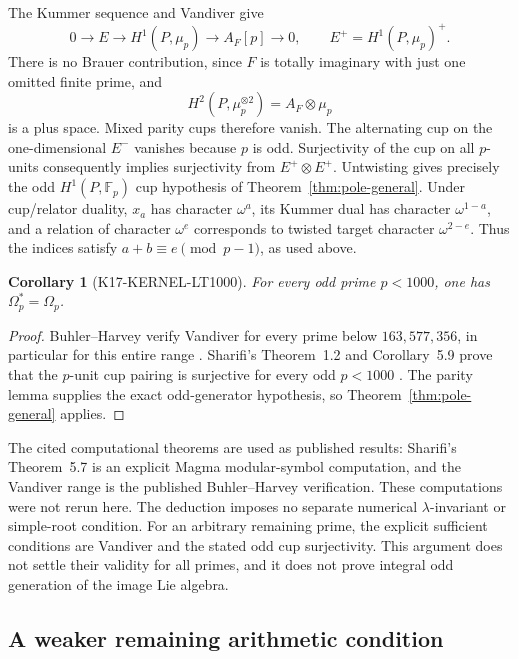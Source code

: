 \documentclass[11pt,a4paper]{article}
\newtheorem{corollary}[theorem]{Corollary}
\theoremstyle{definition}
\begin{document}
The Kummer sequence and Vandiver give
\[
 0\longrightarrow E\longrightarrow H^1(P,\mu_p)
  \longrightarrow A_F[p]\longrightarrow0,
 \qquad E^+=H^1(P,\mu_p)^+.
\]
There is no Brauer contribution, since $F$ is totally imaginary with just one omitted finite prime, and
\[
 H^2(P,\mu_p^{\otimes2})=A_F\otimes\mu_p
\]
is a plus space. Mixed parity cups therefore vanish. The alternating cup on the one-dimensional $E^-$ vanishes because $p$ is odd. Surjectivity of the cup on all $p$-units consequently implies surjectivity from $E^+\otimes E^+$. Untwisting gives precisely the odd $H^1(P,\mathbb F_p)$ cup hypothesis of Theorem~\ref{thm:pole-general}. Under cup/relator duality, $x_a$ has character $\omega^a$, its Kummer dual has character $\omega^{1-a}$, and a relation of character $\omega^e$ corresponds to twisted target character $\omega^{2-e}$. Thus the indices satisfy $a+b\equiv e\pmod{p-1}$, as used above.

\begin{corollary}[K17-KERNEL-LT1000]\label{cor:kernel-lt1000}
For every odd prime $p<1000$, one has $\Omega_p^*=\Omega_p$.
\end{corollary}
\begin{proof}
Buhler--Harvey verify Vandiver for every prime below $163{,}577{,}356$, in particular for this entire range \cite[abstract and \S1, p.~1]{BuhlerHarvey2011}. Sharifi's Theorem~1.2 and Corollary~5.9 prove that the $p$-unit cup pairing is surjective for every odd $p<1000$ \cite[pp.~2 and~27]{Sharifi2007}. The parity lemma supplies the exact odd-generator hypothesis, so Theorem~\ref{thm:pole-general} applies.
\end{proof}

The cited computational theorems are used as published results: Sharifi's Theorem~5.7 is an explicit Magma modular-symbol computation, and the Vandiver range is the published Buhler--Harvey verification. These computations were not rerun here. The deduction imposes no separate numerical $\lambda$-invariant or simple-root condition. For an arbitrary remaining prime, the explicit sufficient conditions are Vandiver and the stated odd cup surjectivity. This argument does not settle their validity for all primes, and it does not prove integral odd generation of the image Lie algebra.

\subsection{A weaker remaining arithmetic condition}
\label{sec:pole-nonvanishing}
\end{document}
